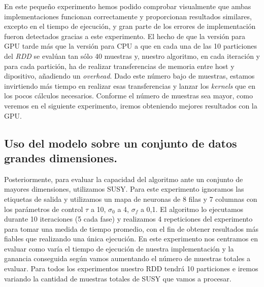 En este pequeño experimento hemos podido comprobar visualmente que ambas implementaciones funcionan correctamente y proporcionan resultados similares, excepto en el tiempo de ejecución, y gran parte de los errores de implementación fueron detectados gracias a este experimento. El hecho de que la versión para GPU tarde más que la versión para CPU a que en cada una de las 10 particiones del \textit{RDD} se evalúan tan sólo 40 muestras y, nuestro algoritmo, en cada iteración y para cada partición, ha de realizar transferencias de memoria entre host y dipositivo, añadiendo un \textit{overhead}. Dado este número bajo de muestras, estamos invirtiendo más tiempo en realizar esas transferencias y lanzar los \textit{kernels} que en los pocos cálculos necesarios. Conforme el número de muestras sea mayor, como veremos en el siguiente experimento, iremos obteniendo mejores resultados con la GPU. 

\subsection{Uso del modelo sobre un conjunto de datos grandes dimensiones.}
Posteriormente, para evaluar la capacidad del algoritmo ante un conjunto de mayores dimensiones, utilizamos SUSY. Para este experimento ignoramos las etiquetas de salida y utilizamos un mapa de neuronas de 8 filas y 7 columnas con los parámetros de control $\tau$ a 10, $\sigma_0$ a 4, $\sigma_f$ a 0,1. El algoritmo lo ejecutamos durante 10 iteraciones (5 cada fase) y realizamos 4 repeticiones del experimento para tomar una medida de tiempo promedio, con el fin de obtener resultados más fiables que realizando una única ejecución. En este experimento nos centramos en evaluar como varía el tiempo de ejecución de nuestra implementación y la ganancia conseguida según vamos aumentando el número de muestras totales a evaluar. Para todos los experimentos nuestro RDD tendrá 10 particiones e iremos variando la cantidad de muestras totales de SUSY que vamos a procesar.

